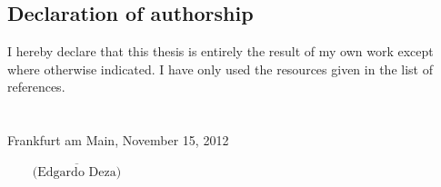 \documentclass[a4paper,12pt, titlepage]{article}  %
\begin{document}
\pagestyle{empty}
\maketitle


\clearpage

\subsection*{Declaration of authorship}
I hereby declare that this thesis is entirely the result of my own work except where otherwise indicated. 
I have only used the resources given in the list of references.
\\\\\\
\noindent Frankfurt am Main, November 15, 2012
\begin{flushright}
$\overline{~~~~~~~~~\mbox{(Edgardo Deza)}~~~~~~~~~}$
\end{flushright}



\clearpage
\end{document}
